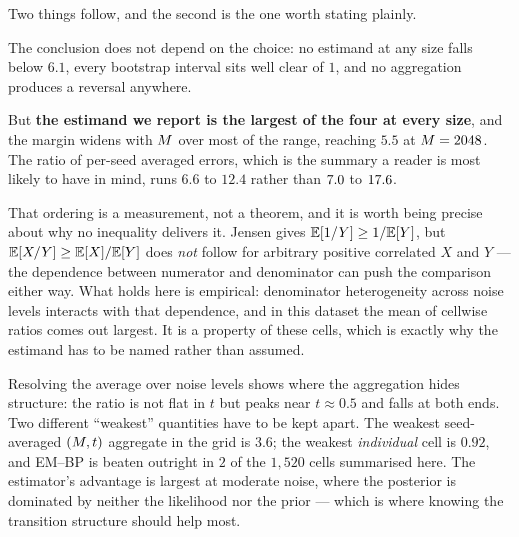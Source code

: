 \noindent Two things follow, and the second is the one worth stating plainly.

The conclusion does not depend on the choice: no estimand at any size falls
below $6.1$, every bootstrap interval sits well clear of $1$, and no
aggregation produces a reversal anywhere.

But \textbf{the estimand we report is the largest of the four at every
size}, and the margin widens with $M$ over most of the range, reaching
$5.5$ at $M=2048$. The ratio of per-seed averaged errors, which is the summary a
reader is most likely to have in mind, runs $6.6$ to $12.4$
rather than $7.0$ to $17.6$.

That ordering is a measurement, not a theorem, and it is worth being precise
about why no inequality delivers it. Jensen gives $\mathbb{E}[1/Y]\ge 1/\mathbb{E}[Y]$, but
$\mathbb{E}[X/Y]\ge\mathbb{E}[X]/\mathbb{E}[Y]$ does \emph{not} follow for arbitrary positive
correlated $X$ and $Y$ --- the dependence between numerator and denominator
can push the comparison either way. What holds here is empirical:
denominator heterogeneity across noise levels interacts with that
dependence, and in this dataset the mean of cellwise ratios comes out
largest. It is a property of these cells, which is exactly why the estimand
has to be named rather than assumed.

Resolving the average over noise levels shows where the aggregation hides
structure: the ratio is not flat in $t$ but peaks near $t \approx 0.5$ and
falls at both ends. Two different ``weakest'' quantities have to be kept
apart. The weakest seed-averaged $(M,t)$ aggregate in the grid is
$3.6$; the weakest \emph{individual} cell is
$0.92$, and EM--BP is beaten outright in $2$ of
the $1,520$ cells summarised here.
The estimator's advantage is largest at moderate noise, where the posterior is
dominated by neither the likelihood nor the prior --- which is where knowing
the transition structure should help most.
